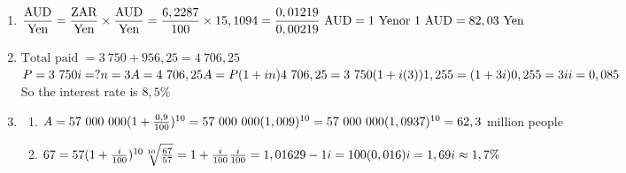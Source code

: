 \begin{eocsolutions}{}
{\begin{enumerate}[itemsep=5pt, label=\textbf{\arabic*}. ]
\item $\dfrac{\mbox{AUD}}{\mbox{Yen}}=\dfrac{\mbox{ZAR}}{\mbox{Yen}} \times \dfrac{\mbox{AUD}}{\mbox{Yen}} \\[4pt]
= \dfrac{6,2287}{100} \times 15,1094 \\[4pt]
= \dfrac{0,01219}{0,00219} \mbox{ AUD} \\[4pt]
= 1 \mbox{ Yen} \\
\mbox{or } 1 \mbox{ AUD} = 82,03 \mbox{ Yen}$
\item $\mbox{Total paid } = 3~750 + 956,25 = 4~706,25$\\
$P=3~750\\
i=?\\
n=3\\
A=4~706,25\\
 A=P(1 + in) \\
4~706,25 = 3~750(1+ i(3))\\
1,255 = (1 + 3i)\\
0,255 = 3i \\
i = 0,085$\\
So the interest rate is $8,5 \%$

\item
\begin{enumerate}[noitemsep, label=\textbf{(\alph*)} ]
    \item $A = 57~000~000 (1 + \frac{0,9}{100})^{10}\\
	     = 57~000~000 (1,009)^{10}\\
	     = 57~000~000 (1,0937)^{10}\\
	     = 62,3$ million people
    \item $67 = 57 (1 + \frac{i}{100})^{10}\\
\sqrt[10]{\frac{67}{57}} = 1 + \frac{i}{100}\\
	\frac{i}{100} = 1,01629 - 1\\
	    i = 100 (0,016)\\
	    i = 1,69\\
	    i \approx 1,7\%$
\end{enumerate}
\end{enumerate}}
\end{eocsolutions}


